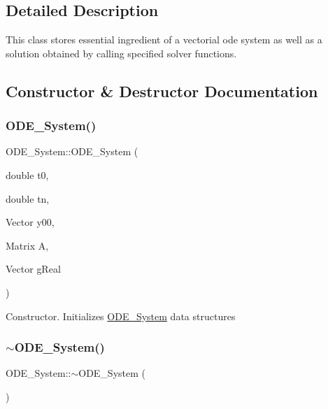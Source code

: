\subsection{Detailed Description}
This class stores essential ingredient of a vectorial ode system as well as a solution obtained by calling specified solver functions. 

\subsection{Constructor \& Destructor Documentation}
\mbox{\label{class_o_d_e___system_a38bd032b6faa0acc252c8c6c14a734b6}} 
\subsubsection{\texorpdfstring{O\+D\+E\+\_\+\+System()}{ODE\_System()}}
{\footnotesize\ttfamily O\+D\+E\+\_\+\+System\+::\+O\+D\+E\+\_\+\+System (\begin{DoxyParamCaption}\item[{double}]{t0,  }\item[{double}]{tn,  }\item[{Vector}]{y00,  }\item[{Matrix}]{A,  }\item[{Vector }]{gReal }\end{DoxyParamCaption})}

Constructor. Initializes \mbox{\hyperlink{class_o_d_e___system}{O\+D\+E\+\_\+\+System}} data structures \mbox{\label{class_o_d_e___system_a1d38890ff0950344d4d34b9fab6a956b}} 
\subsubsection{\texorpdfstring{$\sim$\+O\+D\+E\+\_\+\+System()}{~ODE\_System()}}
{\footnotesize\ttfamily O\+D\+E\+\_\+\+System\+::$\sim$\+O\+D\+E\+\_\+\+System (\begin{DoxyParamCaption}{ }\end{DoxyParamCaption})}

